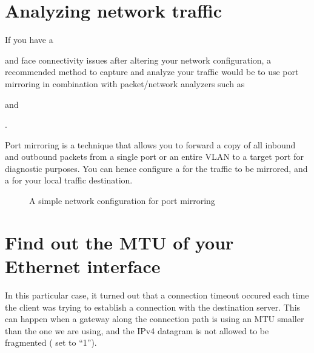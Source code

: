 \documentclass[a4paper,10pt,english,openany,oneside]{sphinxmanual}
\begin{document}
\chapter{Analyzing network traffic}
\label{\detokenize{mtu-connectivity:analyzing-network-traffic}}
\sphinxAtStartPar
If you have a %
\begin{footnote}[16]\sphinxAtStartFootnote
{}
%
\end{footnote} and face connectivity issues after altering your network configuration, a recommended method to capture and analyze your traffic would be to use port mirroring in combination with packet/network analyzers such as %
\begin{footnote}[17]\sphinxAtStartFootnote
{}
%
\end{footnote} and %
\begin{footnote}[18]\sphinxAtStartFootnote
{}
%
\end{footnote}.

\sphinxAtStartPar
Port mirroring is a technique that allows you to forward a copy of all inbound and outbound packets from a single port or an entire VLAN to a target port for diagnostic purposes. You can hence configure a  for the traffic to be mirrored, and a  for your local traffic destination.

\begin{figure}[H]
\centering
\capstart

\noindent{}
\caption{A simple network configuration for port mirroring}\label{\detokenize{mtu-connectivity:id3}}\end{figure}


\chapter{Find out the MTU of your Ethernet interface}
\label{\detokenize{mtu-connectivity:find-out-the-mtu-of-your-ethernet-interface}}
\sphinxAtStartPar
In this particular case, it turned out that a connection timeout occured each time the client was trying to establish a connection with the destination server. This can happen when a gateway along the connection path is using an MTU smaller than the one we are using, and the IPv4 datagram is not allowed to be fragmented ( set to “1”).
\end{document}
